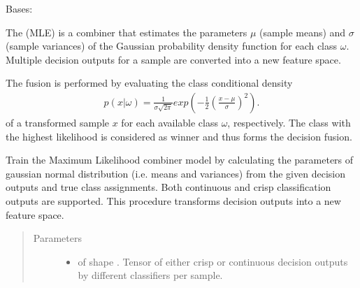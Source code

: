 \documentclass[letterpaper,10pt,english]{sphinxmanual}
\begin{document}
\begin{fulllineitems}
\label{\detokenize{pusion.core.maximum_likelihood_combiner:pusion.core.maximum_likelihood_combiner.MaximumLikelihoodCombiner}}
\sphinxAtStartPar
Bases: {\hyperref[\detokenize{pusion.core.combiner:pusion.core.combiner.TrainableCombiner}]{}}

\sphinxAtStartPar
The {\hyperref[\detokenize{pusion.core.maximum_likelihood_combiner:pusion.core.maximum_likelihood_combiner.MaximumLikelihoodCombiner}]{}} (MLE) is a combiner that estimates the parameters \(\mu\) (sample means)
and \(\sigma\) (sample variances) of the Gaussian probability density function for each class \(\omega\).
Multiple decision outputs for a sample are converted into a new feature space.

\sphinxAtStartPar
The fusion is performed by evaluating the class conditional density
\begin{equation*}
\begin{split}p(x|\omega) = \frac{1}{\sigma \sqrt{2 \pi}}
    exp\left({-\frac{1}{2}\left(\frac{x-\mu}{\sigma}\right)^2}\right).\end{split}
\end{equation*}
\sphinxAtStartPar
of a transformed sample \(x\) for each available class \(\omega\), respectively. The class with the highest
likelihood is considered as winner and thus forms the decision fusion.

\begin{fulllineitems}
\label{\detokenize{pusion.core.maximum_likelihood_combiner:pusion.core.maximum_likelihood_combiner.MaximumLikelihoodCombiner.train}}
\sphinxAtStartPar
Train the Maximum Likelihood combiner model by calculating the parameters of gaussian normal distribution
(i.e. means and variances) from the given decision outputs and true class assignments.
Both continuous and crisp classification outputs are supported. This procedure transforms decision outputs
into a new feature space.
\begin{quote}\begin{description}
\item[{Parameters}] \leavevmode\begin{itemize}
\item {} 
\sphinxAtStartPar
{} \textendash{}  of shape .
Tensor of either crisp or continuous decision outputs by different classifiers per sample.


\end{itemize}
\end{description}
\end{quote}
\end{fulllineitems}
\end{fulllineitems}
\end{document}
